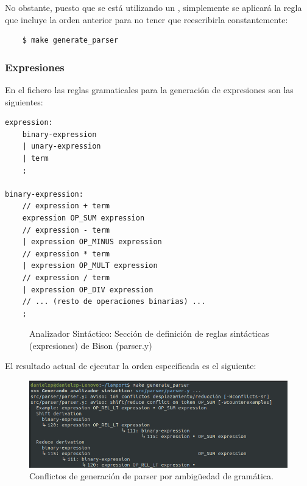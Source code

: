 \vspace{0.5cm}

No obstante, puesto que se está utilizando un , simplemente se aplicará la regla que incluye la orden anterior para no tener que reescribirla constantemente:
\begin{verbatim}
    $ make generate_parser
\end{verbatim}

\subsubsection{Expresiones}
En el fichero  las reglas gramaticales para la generación de expresiones son las siguientes:

\newpage

\begin{lstlisting}[style=customflex]
expression:
    binary-expression
    | unary-expression
    | term
    ;

binary-expression:
    // expression + term
    expression OP_SUM expression
    // expression - term
    | expression OP_MINUS expression
    // expression * term
    | expression OP_MULT expression
    // expression / term
    | expression OP_DIV expression
    // ... (resto de operaciones binarias) ...
    ;

\end{lstlisting}
\begin{figure}[h]
\caption{Analizador Sintáctico: Sección de definición de reglas sintácticas (expresiones) de Bison (parser.y)}
\label{fig:bisonExpressionRules}
\end{figure}

\noindent
El resultado actual de ejecutar la orden especificada es el siguiente:
\begin{figure}[h]
    \includegraphics[width=\linewidth]{images/implementacion/parser/parser_conflicts.png}
    \caption{Conflictos de generación de parser por ambigüedad de gramática.}
    \label{fig:parser_conflictos}
\end{figure}

